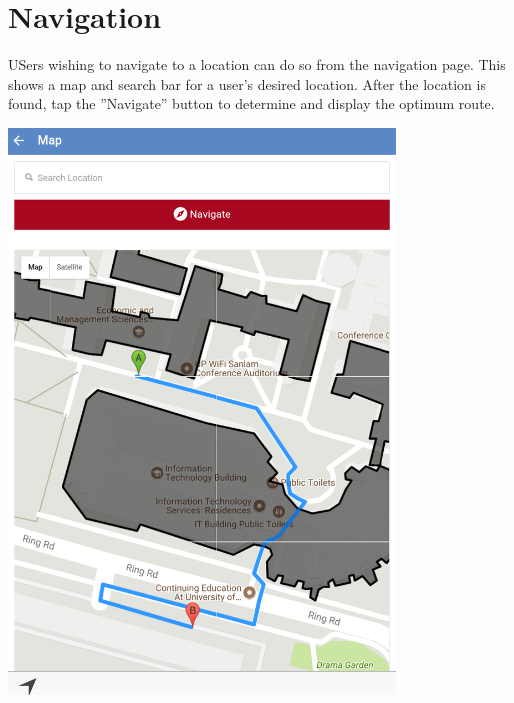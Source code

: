 \documentclass{article}
\begin{document}
\newpage
\section{Navigation}
	USers wishing to navigate to a location can do so from the navigation page. This shows a map and search bar for a user's desired location. After the location is found, tap the ''Navigate'' button to determine and display the optimum route.
	\\
	\par
	\includegraphics[height=15cm]{map.png}
\end{document}
